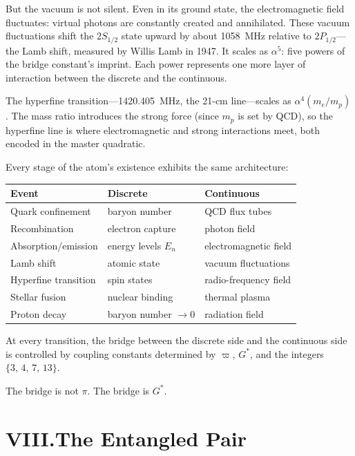 \documentclass[11pt,a4paper]{article}
\newcommand{\Gstar}{{G^{*}}}
\newcommand{\vpi}{\varpi}
\begin{document}
But the vacuum is not silent. Even in its ground state, the electromagnetic field fluctuates: virtual photons are constantly created and annihilated. These vacuum fluctuations shift the $2S_{1/2}$ state upward by about 1058~MHz relative to $2P_{1/2}$---the Lamb shift, measured by Willis Lamb in 1947. It scales as $\alpha^5$: five powers of the bridge constant's imprint. Each power represents one more layer of interaction between the discrete and the continuous.

The hyperfine transition---1420.405~MHz, the 21-cm line---scales as $\alpha^4(m_e/m_p)$. The mass ratio introduces the strong force (since $m_p$ is set by QCD), so the hyperfine line is where electromagnetic and strong interactions meet, both encoded in the master quadratic.

Every stage of the atom's existence exhibits the same architecture:

\begin{center}
\begin{tabular}{lll}
\toprule
\textbf{Event} & \textbf{Discrete} & \textbf{Continuous} \\
\midrule
Quark confinement & baryon number & QCD flux tubes \\
Recombination & electron capture & photon field \\
Absorption/emission & energy levels $E_n$ & electromagnetic field \\
Lamb shift & atomic state & vacuum fluctuations \\
Hyperfine transition & spin states & radio-frequency field \\
Stellar fusion & nuclear binding & thermal plasma \\
Proton decay & baryon number $\to 0$ & radiation field \\
\bottomrule
\end{tabular}
\end{center}

At every transition, the bridge between the discrete side and the continuous side is controlled by coupling constants determined by $\vpi$, $\Gstar$, and the integers $\{3,\,4,\,7,\,13\}$.

The bridge is not $\pi$. The bridge is $\Gstar$.

\section*{VIII.\quad The Entangled Pair}
\end{document}

